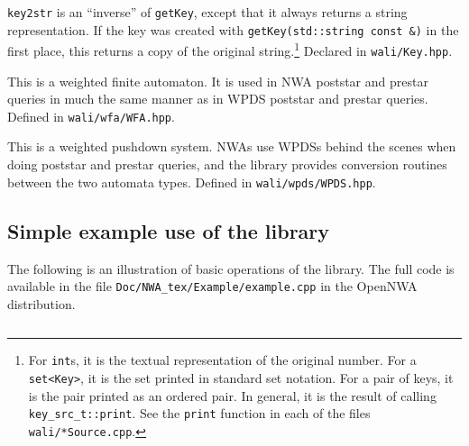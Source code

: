 \begin{functionlist}
    \texttt{key2str} is an ``inverse'' of \texttt{getKey}, except that it
    always returns a string representation. If the key was created with
    \texttt{getKey(std::string const \&)} in the first place, this
    returns a copy of the original string.\footnote{For \texttt{int}s, it is the
    textual representation of the original number. For a \texttt{set<Key>},
    it is the set printed in standard set notation. For a pair of keys, it is
    the pair printed as an ordered pair. In general, it is the result of
    calling \texttt{key\_src\_t::print}. See the \texttt{print} function in
    each of the files \texttt{wali/*Source.cpp}.} Declared in
    \texttt{wali/Key.hpp}.

   This is a weighted finite automaton. It is
    used in NWA poststar and prestar queries in much the same manner as in
    WPDS poststar and prestar queries. Defined in \texttt{wali/wfa/WFA.hpp}.

   This is a weighted pushdown system. NWAs use
    WPDSs behind the scenes when doing poststar and prestar queries, and the
    library provides conversion routines between the two automata
    types. Defined in \texttt{wali/wpds/WPDS.hpp}.
\end{functionlist}


\subsection{Simple example use of the library}
\label{Se:ExampleUse}
The following is an illustration of basic operations of the library. The full
code is available in the file \texttt{Doc/NWA\_tex/Example/example.cpp} in the
OpenNWA distribution.

\inputminted{c++}{Example/example-abbrev.cpp}

